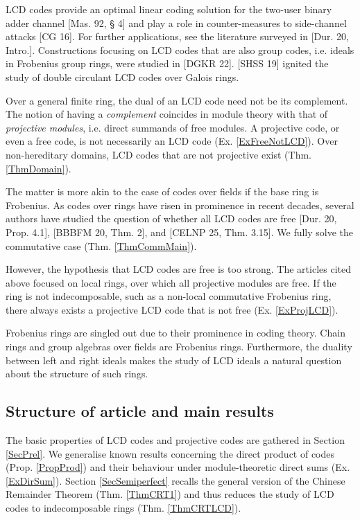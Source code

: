 \documentclass{article}
\theoremstyle{plain}
\theoremstyle{plain}
\theoremstyle{remark}
\theoremstyle{plain}
\begin{document}
LCD codes provide an optimal linear coding solution for the two-user binary adder channel [Mas. 92, § 4] and play a role in counter-measures to side-channel attacks [CG 16]. For further applications, see the literature surveyed in [Dur. 20, Intro.].  Constructions focusing on LCD codes that are
also group codes, i.e. ideals in Frobenius group rings, were studied in [DGKR 22]. [SHSS 19] ignited the study of double circulant LCD codes over Galois rings. 

\smallskip 

Over a general finite ring, the dual of an LCD code need not be its complement. The notion of having a \textit{complement} coincides in module theory with that of \textit{projective modules}, i.e. direct summands of free modules. A projective code, or even a free code, is not necessarily an LCD code (Ex. \ref{ExFreeNotLCD}). Over non-hereditary domains, LCD codes that are not projective exist (Thm. \ref{ThmDomain}). 

The matter is more akin to the case of codes over fields if the base ring is Frobenius. As codes over rings have risen in prominence in recent decades,
several authors have studied the question of whether all LCD codes are free [Dur. 20,  Prop. 4.1], [BBBFM 20, Thm. 2], and [CELNP 25, Thm. 3.15].  We fully solve the commutative case (Thm. \ref{ThmCommMain}).

However, the hypothesis that LCD codes are free is too strong. The articles cited above focused on local rings, over which all projective modules are free. If the ring is not indecomposable, such as a non-local commutative Frobenius ring, there always exists a projective LCD code that is not free (Ex. \ref{ExProjLCD}). 

Frobenius rings are singled out due to their prominence in coding theory. Chain rings and group algebras over fields are Frobenius rings. Furthermore, the duality between left and right ideals makes the study of LCD ideals a natural question about the structure of such rings. 





\subsection{Structure of article and main results}

The basic properties of LCD codes and projective codes are gathered in Section \ref{SecPrel}. We generalise known results concerning the direct product of codes (Prop. \ref{PropProd}) and their behaviour under module-theoretic direct sums (Ex. \ref{ExDirSum}). Section \ref{SecSemiperfect} recalls the general version of the Chinese Remainder Theorem (Thm. \ref{ThmCRT1}) and thus reduces the study of LCD codes to indecomposable rings (Thm. \ref{ThmCRTLCD}).
\end{document}
